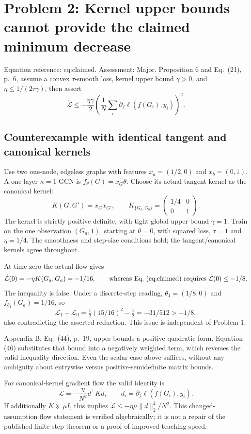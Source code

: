 \documentclass[10pt]{article}
\begin{document}
\section*{Problem 2: Kernel upper bounds cannot provide the claimed minimum decrease}
Equation reference: eq:claimed. Assessment: Major. Proposition 6 and Eq. (21), p. 6, assume a convex \(\tau\)-smooth loss, kernel upper bound \(\gamma>0\), and \(\eta\leq1/(2\tau\gamma)\), then assert \[\dot{\mathcal L}\leq-\frac{\eta\gamma}{2}
 \left(\frac1N\sum_i\partial_f\ell(f(G_i),y_i)\right)^2.
 \]\par
\subsection*{Counterexample with identical tangent and canonical kernels}
Use two one-node, edgeless graphs with features \(x_a=(1/2,0)\) and \(x_b=(0,1)\). A one-layer \(\kappa=1\) GCN is \(f_\theta(G)=x_G^\top\theta\). Choose its actual tangent kernel as the canonical kernel: \[K(G,G')=x_G^\top x_{G'},\qquad
 K_{\{G_a,G_b\}}=\begin{pmatrix}1/4&0\\0&1\end{pmatrix}.\] The kernel is strictly positive definite, with tight global upper bound \(\gamma=1\). Train on the one observation \((G_a,1)\), starting at \(\theta=0\), with squared loss, \(\tau=1\) and \(\eta=1/4\). The smoothness and step-size conditions hold; the tangent/canonical kernels agree throughout.\par
At time zero the actual flow gives \[\dot{\mathcal L}(0)=-\eta K(G_a,G_a)=-1/16,
 \qquad\hbox{whereas Eq.~\text{(eq:claimed)} requires }\dot{\mathcal L}(0)\leq-1/8.\] The inequality is false. Under a discrete-step reading, \(\theta_1=(1/8,0)\) and \(f_{\theta_1}(G_a)=1/16\), so \[\mathcal L_1-\mathcal L_0
 =\tfrac12(15/16)^2-\tfrac12=-31/512>-1/8,\] also contradicting the asserted reduction. This issue is independent of Problem 1.\par
Appendix B, Eq. (44), p. 19, upper-bounds a positive quadratic form. Equation (46) substitutes that bound into a negatively weighted term, which reverses the valid inequality direction. Even the scalar case above suffices, without any ambiguity about entrywise versus positive-semidefinite matrix bounds.\par
For canonical-kernel gradient flow the valid identity is \[\dot{\mathcal L}=-\frac{\eta}{N^2}d^\top Kd,\qquad
 d_i=\partial_f\ell(f(G_i),y_i).\] If additionally \(K\succeq\mu I\), this implies \(\dot{\mathcal L}\leq-\eta\mu\|d\|_2^2/N^2\). This changed-assumption flow statement is verified algebraically; it is not a repair of the published finite-step theorem or a proof of improved teaching speed.\par
\end{document}
